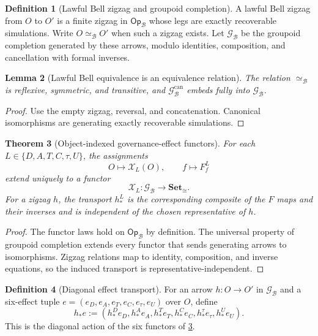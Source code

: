 \documentclass[11pt]{article}
\newtheorem{theorem}{Theorem}[section]
\newtheorem{lemma}[theorem]{Lemma}
\theoremstyle{definition}
\newtheorem{definition}[theorem]{Definition}
\newcommand{\Bell}{\mathcal{B}}
\newcommand{\BellCan}{\mathcal{G}_{\Bell}^{\mathrm{can}}}
\newcommand{\BellBase}{\mathsf{Op}_{\Bell}}
\newcommand{\BellLaw}{\mathscr{G}_{\Bell}}
\newcommand{\BellEq}{\simeq_{\Bell}}
\begin{document}
\begin{definition}[Lawful Bell zigzag and groupoid completion]\label{def:lawfulequivalence}
A lawful Bell zigzag from $O$ to $O'$ is a finite zigzag in $\BellBase$ whose legs are exactly recoverable simulations. Write $O\BellEq O'$ when such a zigzag exists. Let $\BellLaw$ be the groupoid completion generated by these arrows, modulo identities, composition, and cancellation with formal inverses.
\end{definition}

\begin{lemma}[Lawful Bell equivalence is an equivalence relation]\label{lem:lawfulequivalence}
The relation $\BellEq$ is reflexive, symmetric, and transitive, and $\BellCan$ embeds fully into $\BellLaw$.
\end{lemma}
\begin{proof}
Use the empty zigzag, reversal, and concatenation. Canonical isomorphisms are generating exactly recoverable simulations.
\end{proof}

\begin{theorem}[Object-indexed governance-effect functors]\label{thm:effectfunctors}
For each $L\in\{D,A,T,C,\tau,U\}$, the assignments
\[
O\longmapsto\mathscr X_L(O),\qquad
f\longmapsto F_f^L
\]
extend uniquely to a functor
\[
\mathscr X_L:\BellLaw\longrightarrow\mathbf{Set}_{\cong}.
\]
For a zigzag $h$, the transport $h_*^L$ is the corresponding composite of the $F$ maps and their inverses and is independent of the chosen representative of $h$.
\end{theorem}
\begin{proof}
The functor laws hold on $\BellBase$ by definition. The universal property of groupoid completion extends every functor that sends generating arrows to isomorphisms. Zigzag relations map to identity, composition, and inverse equations, so the induced transport is representative-independent.
\end{proof}

\begin{definition}[Diagonal effect transport]\label{def:diagonaleffecttransport}
For an arrow $h:O\to O'$ in $\BellLaw$ and a six-effect tuple $e=(e_D,e_A,e_T,e_C,e_{\tau},e_U)$ over $O$, define
\[
h_*e:=(h_*^De_D,h_*^Ae_A,h_*^Te_T,h_*^Ce_C,h_*^{\tau}e_{\tau},h_*^Ue_U).
\]
This is the diagonal action of the six functors of \cref{thm:effectfunctors}.
\end{definition}
\end{document}

